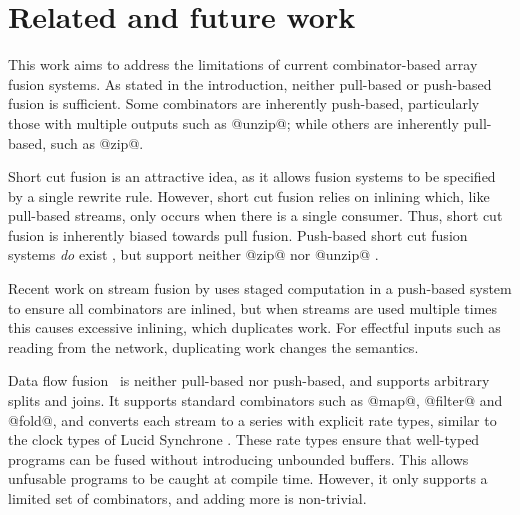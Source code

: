 \chapter{Related and future work}
\label{related}

\label{related/fusion}
\label{related/stream-fusion}
\label{related/synchronised-product}
\label{related/tupling}
\label{related/push-arrays}

This work aims to address the limitations of current combinator-based array fusion systems.
As stated in the introduction, neither pull-based or push-based fusion is sufficient.
Some combinators are inherently push-based, particularly those with multiple outputs such as @unzip@; while others are inherently pull-based, such as @zip@.

Short cut fusion is an attractive idea, as it allows fusion systems to be specified by a single rewrite rule.
However, short cut fusion relies on inlining which, like pull-based streams, only occurs when there is a single consumer.
Thus, short cut fusion is inherently biased towards pull fusion.
Push-based short cut fusion systems \emph{do} exist \cite{gill1993short}, but support neither @zip@ nor @unzip@ \cite{svenningsson2002shortcut,lippmeier2013data}.

Recent work on stream fusion by \citet{kiselyov2016stream} uses staged computation in a push-based system to ensure all combinators are inlined, but when streams are used multiple times this causes excessive inlining, which duplicates work.
For effectful inputs such as reading from the network, duplicating work changes the semantics.

Data flow fusion~\cite{lippmeier2013data} is neither pull-based nor push-based, and supports arbitrary splits and joins.
It supports standard combinators such as @map@, @filter@ and @fold@, and converts each stream to a series with explicit rate types, similar to the clock types of Lucid Synchrone \cite{benveniste2003synchronous}.
These rate types ensure that well-typed programs can be fused without introducing unbounded buffers.
This allows unfusable programs to be caught at compile time.
However, it only supports a limited set of combinators, and adding more is non-trivial.

